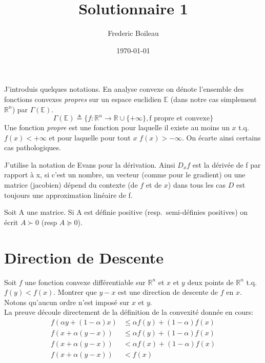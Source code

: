 

\renewcommand{\familydefault}{\sfdefault}
\usepackage{titling}
\usepackage{amsmath}
\usepackage{fancyhdr}
\pagestyle{fancy}

\title{Solutionnaire 1}
\author{Frederic Boileau}
\date{\today}




\fancyhf{}
\maketitle
\thispagestyle{fancy}

J'introduis quelques notations. En analyse convexe on dénote l'ensemble
des fonctions convexes \emph{propres} sur un espace euclidien $\mathbb E$
(dans notre cas simplement $\mathbb R^n$) par $\Gamma (\mathbb E)$.
\begin{equation*}
    \Gamma (\mathbb E) \triangleq \{f : \mathbb R^n \rightarrow \mathbb R
    \cup \{+\infty\}, \text{f propre et convexe}\}
\end{equation*}
Une fonction \emph{propre} est une fonction pour laquelle il existe au moins un
$x$ t.q. $f(x) < + \infty $ et pour laquelle pour tout $x$ $f(x) > -\infty$. 
On écarte ainsi certains cas pathologiques.

J'utilise la notation de Evans pour la d\'erivation. Ainsi $D_x f$ 
est la d\'eriv\'ee de f par rapport \`a x, si c'est un nombre, un vecteur
(comme pour le gradient) ou une matrice (jacobien) d\'epend du contexte
(de $f$ et de $x$) dans tous les cas $D$ est toujours une approximation
linéaire de f. 

Soit A une matrice. Si A est d\'efinie positive  (resp.\  semi-d\'efinies
positives) on \'ecrit $A \succ 0$ (resp $A \succeq 0$).

\section{Direction de Descente}

Soit $f$ une fonction convexe différentiable sur $\mathbb R^n$ 
et $x$ et $y$ deux points de $\mathbb R^n$ t.q. $f(y) < f(x)$.
Montrer que $y-x$ est une direction de descente de $f$ en $x$.
Notons qu'aucun ordre n'est impos\'e  sur $x$ et $y$.\\

La preuve d\'ecoule directement de la d\'efinition de la 
convexit\'e donn\'ee en cours:
\begin{align*}
    f(\alpha y + (1-\alpha)x) &\leq \alpha f(y) + (1-\alpha)f(x)\\
    f(x + \alpha(y-x)) &\leq \alpha f(y) + (1-\alpha)f(x)\\
    f(x + \alpha(y-x)) &< \alpha f(x) + (1-\alpha)f(x)\\
    f(x + \alpha(y-x)) &< f(x)
\end{align*}

